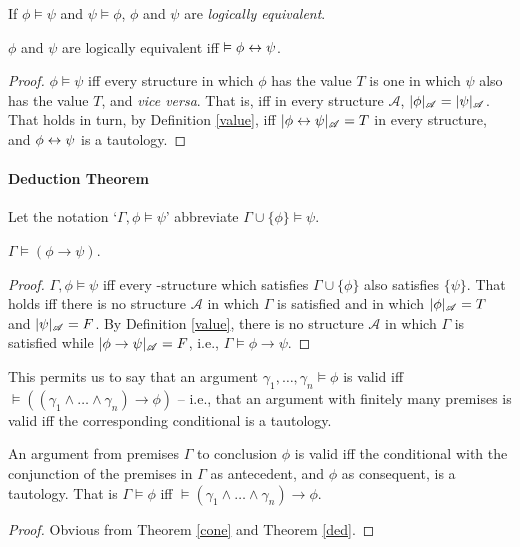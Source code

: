 \begin{definition}[Equivalence]
	If $\phi \vDash \psi$ and $\psi\vDash\phi$, $\phi$ and $\psi$ are \emph{logically equivalent}.
\end{definition}
\begin{theorem}	
		$\phi$ and $\psi$ are logically equivalent iff $\vDash \phi \leftrightarrow \psi$.
		\begin{proof}
		$\phi\vDash\psi$ iff every structure in which $\phi$ has the value $T$ is one in which $\psi$ also has the value $T$, and \emph{vice versa}. That is, iff in every structure $\mathscr{A}$, $|\phi|_{\mathscr{A}}=|\psi|_{\mathscr{A}}$. That holds in turn, by Definition \ref{value}, iff $|\phi\leftrightarrow\psi|_{\mathscr{A}}=T$ in every structure, and $\phi\leftrightarrow\psi$ is a tautology.
		\end{proof}
	\end{theorem}		

\paragraph{Deduction Theorem}
	Let the notation `$\Gamma,\phi \vDash \psi$' abbreviate $\Gamma \cup\{\phi\} \vDash \psi$.\begin{theorem}[Deduction]\label{ded} $\Gamma \vDash (\phi \to \psi)$. 
\begin{proof}
$\Gamma, \phi \vDash \psi$ iff  every \lone-structure which satisfies $\Gamma\cup\{\phi\}$ also satisfies $\{\psi\}$. That holds iff there is no structure $\mathscr{A}$ in which $\Gamma$ is satisfied and in which $|\phi|_{\mathscr{A}}=T$ and $|\psi|_{\mathscr{A}}=F$. By Definition \ref{value}, there is no structure $\mathscr{A}$ in which $\Gamma$ is satisfied while $|\phi\to\psi|_{\mathscr{A}}=F$, i.e., $\Gamma\vDash\phi\to\psi$.
\end{proof}
\end{theorem}
This permits us to say that an argument $\gamma_{1},\ldots,\gamma_{n} \vDash \phi$ is valid iff $\vDash ((\gamma_{1} \wedge \ldots \wedge \gamma_{n})\to \phi)$ – i.e., that an argument with finitely many premises is valid iff the corresponding conditional is a tautology.\begin{corol}
	An argument from premises $\Gamma$ to conclusion $\phi$ is valid iff the conditional with the conjunction of the premises in $\Gamma$ as antecedent, and $\phi$ as consequent, is a tautology. That is $\Gamma\vDash\phi$ iff $\vDash (\gamma_{1}\wedge\ldots\wedge\gamma_{n}) \to \phi$. \begin{proof}
		Obvious from Theorem \ref{cone} and Theorem \ref{ded}.
	\end{proof}
\end{corol}




